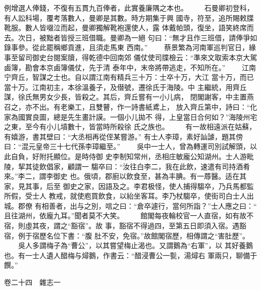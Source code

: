 \documentclass{ctexart}
\begin{document}
例增選人俸錢，不復有五貫九百俸者，此實養廉隅之本也。 　　石曼卿初登科，有人訟科場，覆考落數人，曼卿是其數。時方期集于興 國寺，符至，追所賜敕牒靴服。數人皆啜泣而起，曼卿獨解靴袍還使人，露 体戴帕頭，復坐，語笑終席而去。次日，被黜者皆授三班借職。曼卿為一絕 句曰：``無才且作三班借，請俸爭如錄事參。從此罷稱鄉貢進，且須走馬東 西南。'' 　　蔡景繁為河南軍巡判官日，緣事至留司御史台閱案牘，得乾德中回南郊 儀仗使司牒檢云：``準來文取索本京大駕鹵簿，勘會本京鹵簿儀仗，先于清 泰年中，末帝將帶逃走，不知所在。'' 　　江南宁齊丘，智謀之士也。自以謂江南有精兵三十万：士卒十万，大江 當十万，而已當十万。江南初主，本徐溫養子，及僣號，遷徐氏于海陵。中 主繼統，用齊丘謀，徐氏無男女少長，皆殺之。其后，齊丘嘗有一小儿病， 閉閣謝客，中主置燕召之，亦不出。有老樂工，且雙瞽，作一詩書紙鳶上， 放入齊丘第中，詩曰：``化家為國實良圖，總是先生畫計謨。一個小儿拋不 得，上皇當日合何如？''海陵州宅之東，至今有小儿墳數十，皆當時所殺徐 氏之族也。 　　有一故相遠派在姑蘇，有嬉游，書其壁曰：``大丞相再從侄某嘗游。'' 有士人李璋，素好訕謔，題其傍曰：``混元皇帝三十七代孫李璋繼至。'' 　　吳中一士人，曾為轉運司別試解頭，以此自負，好附托顯位。是時侍御 史李制知常州，丞相庄敏龐公知湖州。士人游毗陵，挈其徒飲倡家，顧謂一 騶卒曰：``汝往白李二，我在此飲，速遣有司持酒肴來。''李二，謂李御史 也。俄頃，郡廚以飲食至，甚為丰腆。有一蓐醫。适在其家，見其事，后至 御史之家，因語及之。李君极怪，使人捕得騶卒，乃兵馬都監所假，受士人 教戒，就使庖買飲食，以紿坐客耳。李乃杖騶卒，使街司白士人出城。郡僚 有相善者，出与之別，唁之曰：``倉卒遽行，當何所詣？''士人應之曰：`` 且往湖州，依龐九耳。''聞者莫不大笑。 　　館閣每夜輪校官一人直宿，如有故不宿，則虛其夜，謂之``豁宿''。故 事，豁宿不得過四，至第五日即須入宿。遇豁宿，例于宿歷名位下書：``腹 肚不安，免宿。''故館閣宿歷，相傳謂之``害肚歷''。 　　吳人多謂梅子為``曹公''，以其嘗望梅止渴也。又謂鵝為``右軍''，以 其好養鵝也。有一士人遺人醋梅与燖鵝，作書云：``醋浸曹公一甏，湯燖右 軍兩只，聊備于饌。''

卷二十四　雜志一
\end{document}

